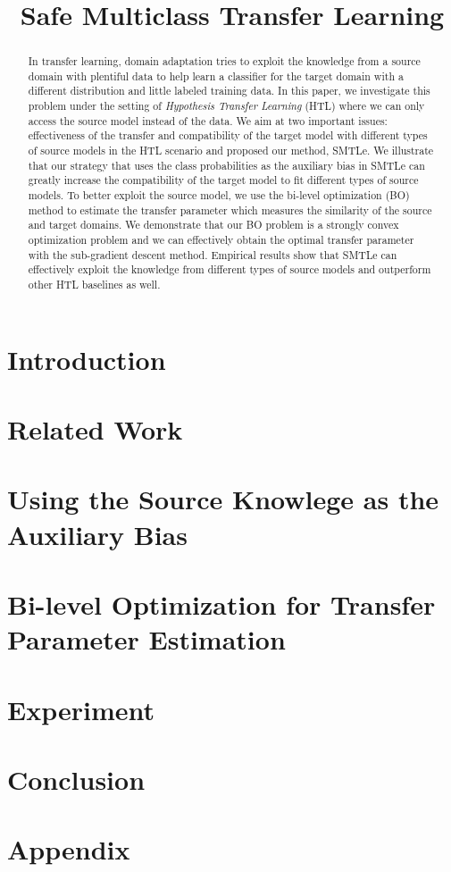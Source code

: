 \documentclass{llncs}
\begin{document}
\title{Safe Multiclass Transfer Learning}
\maketitle
\begin{abstract}
	In transfer learning, domain adaptation tries to exploit the knowledge from a source domain with plentiful data to help learn a classifier for the target domain with a different distribution and little labeled training data. 
	In this paper, we investigate this problem under the setting of \textit{Hypothesis Transfer Learning} (HTL) where we can only access the source model instead of the data. We aim at two important issues: effectiveness of the transfer and compatibility of the target model with different types of source models in the HTL scenario and proposed our method, SMTLe.
	We illustrate that our strategy that uses the class probabilities as the auxiliary bias in SMTLe can greatly increase the compatibility of the target model to fit different types of source models. To better exploit the source model, we use the bi-level optimization (BO) method to estimate the transfer parameter which measures the similarity of the source and target domains. We demonstrate that our BO problem is a strongly convex optimization problem and we can effectively obtain the optimal transfer parameter with the sub-gradient descent method. Empirical results show that SMTLe can effectively exploit the knowledge from different types of source models and outperform other HTL baselines as well.  
\end{abstract}

\section{Introduction}


\section{Related Work}\label{sec:work}


\section{Using the Source Knowlege as the Auxiliary Bias}\label{sec:prob}


\section{Bi-level Optimization for Transfer Parameter Estimation}\label{sec:smitle}


%

\section{Experiment}\label{sec:exp}


\section{Conclusion}



\section*{Appendix}







\end{document}
